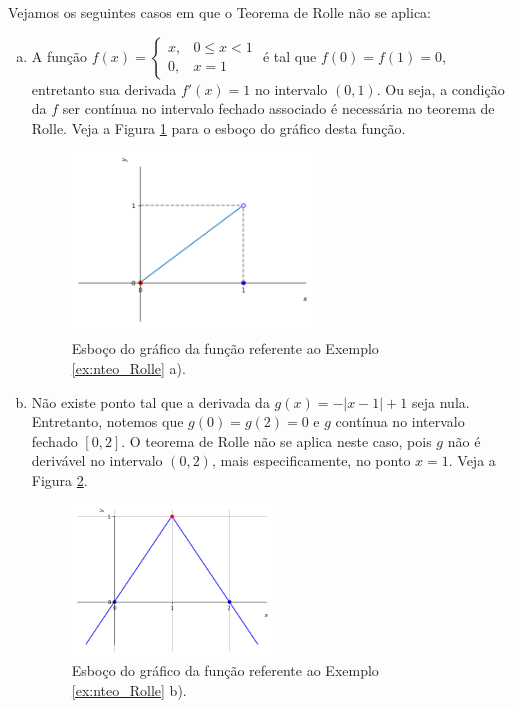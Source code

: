 \cleardoublepage\documentclass[../main.tex]{subfiles}
\begin{document}
\begin{ex}\label{ex:nteo_Rolle}
  Vejamos os seguintes casos em que o Teorema de Rolle não se aplica:
  \begin{enumerate}[a)]
  \item A função
$
      f(x) = \left\{
        \begin{array}{ll}
          x, & 0\leq x < 1\\
          0, & x=1
        \end{array}
      \right.
  $
    é tal que $f(0)=f(1)=0$, entretanto sua derivada $f'(x)=1$ no intervalo $(0, 1)$. Ou seja, a condição da $f$ ser contínua no intervalo fechado associado é necessária no teorema de Rolle. Veja a Figura \ref{fig:ex_fcont_h_2} para o esboço do gráfico desta função.
    
  \begin{figure}[htb]
    \centering
    \includegraphics[width=0.6\textwidth]{./fig_apl_deriv/fig_h}
    \caption{Esboço do gráfico da função referente ao Exemplo \ref{ex:nteo_Rolle} a).}
    \label{fig:ex_fcont_h_2}
  \end{figure}
  \item Não existe ponto tal que a derivada da $g(x)=-|x-1|+1$ seja nula. Entretanto, notemos que $g(0)=g(2)=0$ e $g$ contínua no intervalo fechado $[0, 2]$. O teorema de Rolle não se aplica neste caso, pois $g$ não é derivável no intervalo $(0,2)$, mais especificamente, no ponto $x=1$. Veja a Figura \ref{fig:ex_nteo_Rolle_nderiv}.
  \begin{figure}[H]
    \centering
    \includegraphics[width=0.5\textwidth]{./fig_apl_deriv/fig_ex_nteo_Rolle_nderiv}
    \caption{Esboço do gráfico da função referente ao Exemplo \ref{ex:nteo_Rolle} b).}
    \label{fig:ex_nteo_Rolle_nderiv}
  \end{figure}  
  \end{enumerate}
\end{ex}
\end{document}

